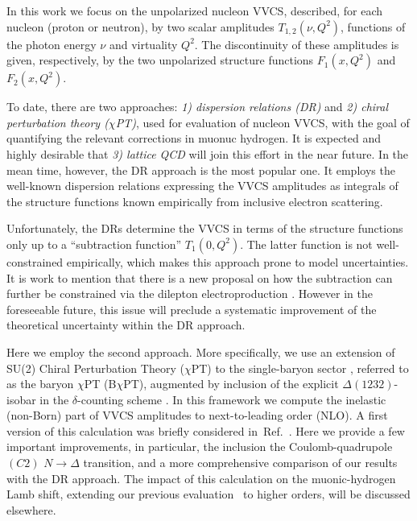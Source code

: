 \documentclass[12pt,preprint,tightenlines,
showpacs,preprintnumbers,amsmath,amssymb,
a4paper,nofootinbib]{revtex4-1}
\def\de{\delta} \def\De{\Delta}
\begin{document}
In this work we focus on the unpolarized nucleon 
VVCS, described, for each nucleon (proton or neutron), by two scalar amplitudes $T_{1,2}(\nu,Q^2)$,
functions of the photon energy $\nu$ and virtuality $Q^2$.
The  discontinuity of these amplitudes is
given, respectively, by the two unpolarized structure functions $F_1(x,Q^2)$ and
$F_{2}(x, Q^2)$.

To date, there are two approaches: 
\textit{1) dispersion relations (DR)} and 
\textit{2) chiral perturbation theory ($
\chi$PT)}, used for evaluation
of nucleon VVCS, with the goal of quantifying the relevant corrections in muonuc hydrogen.
It is expected and  highly desirable that 
\textit{3) lattice QCD} will join this effort in the near future. 
In the mean time, however, the DR approach is the most popular one.
It employs the well-known dispersion relations expressing 
the VVCS amplitudes as integrals of the structure
functions known empirically from inclusive electron scattering. 


Unfortunately, the DRs determine the VVCS in terms of the structure functions only up to a ``subtraction  function'' $T_1(0,Q^2)$. 
The latter function is not well-constrained empirically, which
makes this approach prone to model uncertainties. It is work to mention that there is a
new proposal on how the subtraction can further be constrained
via the dilepton electroproduction \cite{Pauk:2020gjv}. However in the foreseeable future,
this issue will preclude a systematic improvement of the theoretical uncertainty within the DR approach. 


Here we employ the second approach. More specifically, we use an extension of SU(2) Chiral Perturbation Theory ($\chi$PT) \cite{Weinberg:1978kz,Gasser:1983yg} to the single-baryon sector \cite{Gasser:1987rb,Gegelia:1999gf,Fuchs:2003qc}, referred to as the baryon $\chi$PT (B$\chi$PT), augmented by inclusion 
of the explicit $\Delta(1232)$-isobar in the $\de$-counting scheme
\cite{Pascalutsa:2003aa}. 
In this framework we compute the inelastic (non-Born) part of
VVCS amplitudes to next-to-leading order (NLO).
A first version of this calculation was briefly considered in~Ref.~\cite{Lensky:2014dda}. Here we provide a few important improvements, in particular, the inclusion the Coulomb-quadrupole $(C2)$ $N\to \Delta$ transition, and a more comprehensive comparison of our results with the DR approach. 
The impact of this
calculation on the muonic-hydrogen Lamb shift, extending
our previous evaluation~\cite{Alarcon:2013cba} to higher orders, will be discussed elsewhere.
\end{document}
